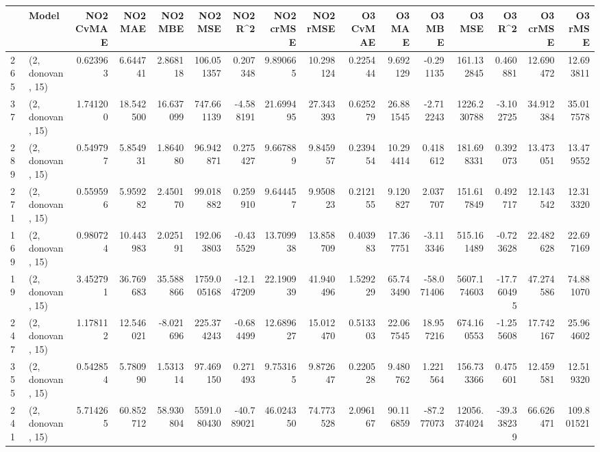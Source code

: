 \begin{tabular}{llrrrrrrrrrrrrrr}
\toprule
{} &             Model &  NO2 CvMAE &    NO2 MAE &    NO2 MBE &      NO2 MSE &    NO2 R\textasciicircum2 &  NO2 crMSE &   NO2 rMSE &  O3 CvMAE &     O3 MAE &     O3 MBE &        O3 MSE &      O3 R\textasciicircum2 &    O3 crMSE &     O3 rMSE \\
\midrule
265 &  (2, donovan, 15) &   0.623963 &   6.644741 &   2.868118 &   106.051357 &   0.207348 &   9.890665 &  10.298124 &  0.225444 &   9.692129 &  -0.291135 &    161.132845 &    0.460881 &   12.690472 &   12.693811 \\
37  &  (2, donovan, 15) &   1.741200 &  18.542500 &  16.637099 &   747.661139 &  -4.588191 &  21.699495 &  27.343393 &  0.625279 &  26.881545 &  -2.712243 &   1226.230788 &   -3.102725 &   34.912384 &   35.017578 \\
289 &  (2, donovan, 15) &   0.549797 &   5.854931 &   1.864080 &    96.942871 &   0.275427 &   9.667889 &   9.845957 &  0.239454 &  10.294414 &   0.418612 &    181.698331 &    0.392073 &   13.473051 &   13.479552 \\
271 &  (2, donovan, 15) &   0.559596 &   5.959282 &   2.450170 &    99.018882 &   0.259910 &   9.644457 &   9.950823 &  0.212155 &   9.120827 &   2.037707 &    151.617849 &    0.492717 &   12.143542 &   12.313320 \\
169 &  (2, donovan, 15) &   0.980724 &  10.443983 &   2.025191 &   192.063803 &  -0.435529 &  13.709938 &  13.858709 &  0.403983 &  17.367751 &  -3.113346 &    515.161489 &   -0.723628 &   22.482628 &   22.697169 \\
19  &  (2, donovan, 15) &   3.452791 &  36.769683 &  35.588866 &  1759.005168 & -12.147209 &  22.190939 &  41.940496 &  1.529229 &  65.743490 & -58.071406 &   5607.174603 &  -17.760495 &   47.274586 &   74.881070 \\
247 &  (2, donovan, 15) &   1.178112 &  12.546021 &  -8.021696 &   225.374243 &  -0.684499 &  12.689627 &  15.012470 &  0.513303 &  22.067545 &  18.957216 &    674.160553 &   -1.255608 &   17.742167 &   25.964602 \\
355 &  (2, donovan, 15) &   0.542854 &   5.780990 &   1.531314 &    97.469150 &   0.271493 &   9.753165 &   9.872647 &  0.220528 &   9.480762 &   1.221564 &    156.733366 &    0.475601 &   12.459581 &   12.519320 \\
241 &  (2, donovan, 15) &   5.714265 &  60.852712 &  58.930804 &  5591.080430 & -40.789021 &  46.024350 &  74.773528 &  2.096167 &  90.116859 & -87.277073 &  12056.374024 &  -39.338239 &   66.626471 &  109.801521 \\

\end{tabular}
